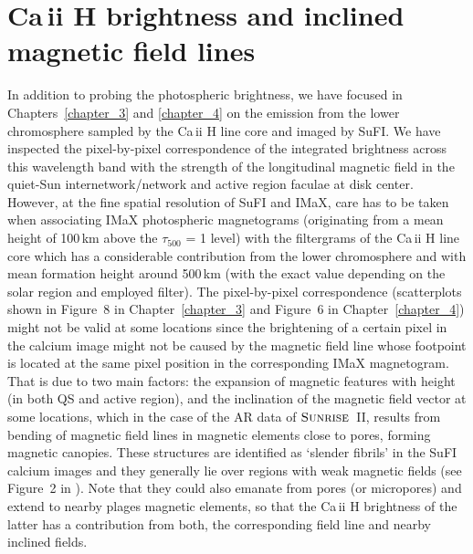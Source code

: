 \documentclass[goettingen, gauss, print]{thesis}
\begin{document}
\section{Ca\,{\sc ii} H brightness and inclined magnetic field lines}
In addition to probing the photospheric brightness, we have focused in Chapters~\ref{chapter_3} and \ref{chapter_4} on the emission from the lower chromosphere sampled by the Ca\,{\sc ii} H line core and imaged by SuFI. We have inspected the pixel-by-pixel correspondence of the integrated brightness across this wavelength band with the strength of the longitudinal magnetic field in the quiet-Sun internetwork/network and active region faculae at disk center. However, at the fine spatial resolution of SuFI and IMaX, care has to be taken when associating IMaX photospheric magnetograms (originating from a mean height of 100\,km above the $\tau_{500}$ = 1 level) with the filtergrams of the Ca\,{\sc ii} H line core which has a considerable contribution from the lower chromosphere and with mean formation height around 500\,km (with the exact value depending on the solar region and employed filter). The pixel-by-pixel correspondence (scatterplots shown in Figure~8 in Chapter~\ref{chapter_3} and Figure~6 in Chapter~\ref{chapter_4}) might not be valid at some locations since the brightening of a certain pixel in the calcium image might not be caused by the magnetic field line whose footpoint is located at the same pixel position in the corresponding IMaX magnetogram. That is due to two main factors: the expansion of magnetic features with height (in both QS and active region), and the inclination of the magnetic field vector at some locations, which in the case of the AR data of $\textsc{Sunrise}$~II, results from bending of magnetic field lines in magnetic elements close to pores, forming magnetic canopies. These structures are identified as `slender fibrils' in the SuFI calcium images and they generally lie over regions with weak magnetic fields (see Figure~2 in \cite{jafarzadeh_slender_2017}). Note that they could also emanate from pores (or micropores) and extend to nearby plages magnetic elements, so that the Ca\,{\sc ii} H brightness of the latter has a contribution from both, the corresponding field line and nearby inclined fields. 
\end{document}
